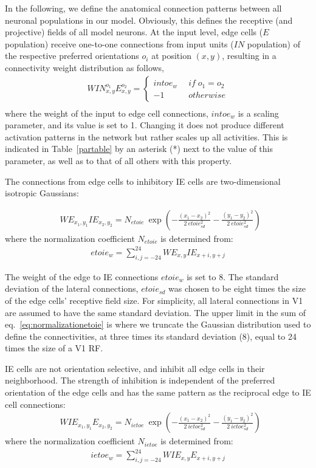 In the following, we define the anatomical connection patterns between
all neuronal populations in our model. Obviously, this defines the
receptive (and projective) fields of all model neurons. At the input
level, edge cells ($E$ population)  receive 
one-to-one
connections from input units
($IN$ population) of the respective preferred
orientations $o_i$ at 
position $(x,y)$,
resulting in
a connectivity weight distribution as follows,
\begin{align}
	WIN^{o_1}_{x,y}E^{o_2}_{x,y}=
	\begin{cases}
	intoe_w \:\;&if\;o_1 = o_2\\\nonumber
	-1\;&otherwise
	\end{cases}\\
\end{align}
where the weight of the input to edge cell connections, $intoe_w$ is a
scaling parameter, and its value is set to 1.  Changing it does not
produce different activation patterns in the network but rather scales
up all activities.
This is indicated in Table~\ref{partable} by an asterisk (*) next to
the value of this parameter, as well as to that of all others with
this property.

The connections from edge cells 
to inhibitory IE cells are two-dimensional isotropic Gaussians: 

\begin{align}
	&WE_{x_1,y_1}IE_{x_2,y_2}=N_{etoie}\: \exp\left(-\frac{(x_1-x_2)^2}{2\: etoie_{sd}^2}-\frac{(y_1-y_2)^2}{2\: etoie_{sd}^2}\right)\
\end{align}
where the normalization coefficient $N_{etoie}$ is determined from:
\begin{align}
	etoie_w = \sum^{24}_{i,j=-24} WE_{x,y}IE_{x+i,y+j}
\label{eq:normalizationetoie}
\end{align}

The weight of the edge to IE connections $etoie_w$ is set to 8. The standard deviation of the lateral connections,
$etoie_{sd}$ was chosen to be eight times the size of the edge cells'
receptive field size. For simplicity, all lateral connections in V1
are assumed to have the same standard deviation.
The upper limit in the sum of eq.~\ref{eq:normalizationetoie} is where
we truncate the Gaussian distribution used to define the
connectivities, at three times its standard deviation (8), equal to 24
times the size of a V1 RF.

IE cells are not orientation selective, and inhibit all edge cells in
their neighborhood. The strength of inhibition is independent of
the preferred orientation of the edge cells and has the same
pattern as the reciprocal edge to IE cell connections: 
\begin{align}
	&WIE_{x_1,y_1}E_{x_2,y_2}=N_{ietoe}\: \exp\left(-\frac{(x_1-x_2)^2}{2\: ietoe_{sd}^2}-\frac{(y_1-y_2)^2}{2\: ietoe_{sd}^2}\right)\
\end{align}
where the normalization coefficient $N_{ietoe}$ is determined from:
\begin{align}
	ietoe_w = \sum^{24}_{i,j=-24} WIE_{x,y}E_{x+i,y+j}
\end{align}

